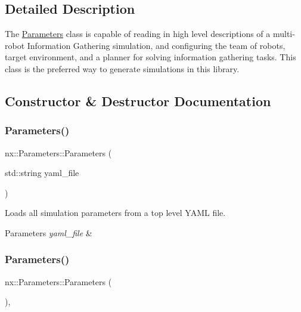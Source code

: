 \subsection{Detailed Description}
The \hyperlink{classnx_1_1Parameters}{Parameters} class is capable of reading in high level descriptions of a multi-\/robot Information Gathering simulation, and configuring the team of robots, target environment, and a planner for solving information gathering tasks. This class is the preferred way to generate simulations in this library. 

\subsection{Constructor \& Destructor Documentation}
\mbox{\label{classnx_1_1Parameters_a40831f91ab8503eceb16026baed0892f}} 
\subsubsection{\texorpdfstring{Parameters()}{Parameters()}\hspace{0.1cm}{\footnotesize\ttfamily [1/2]}}
{\footnotesize\ttfamily nx\+::\+Parameters\+::\+Parameters (\begin{DoxyParamCaption}\item[{std\+::string}]{yaml\+\_\+file }\end{DoxyParamCaption})\hspace{0.3cm}{\ttfamily [inline]}}

Loads all simulation parameters from a top level Y\+A\+ML file. 
\begin{DoxyParams}{Parameters}
{\em yaml\+\_\+file} & \\
\hline
\end{DoxyParams}
\mbox{\label{classnx_1_1Parameters_ac431c1270f5c5c689d3862ae73cb77eb}} 
\subsubsection{\texorpdfstring{Parameters()}{Parameters()}\hspace{0.1cm}{\footnotesize\ttfamily [2/2]}}
{\footnotesize\ttfamily nx\+::\+Parameters\+::\+Parameters (\begin{DoxyParamCaption}{ }\end{DoxyParamCaption})\hspace{0.3cm}{\ttfamily [inline]}, {\ttfamily [protected]}}


